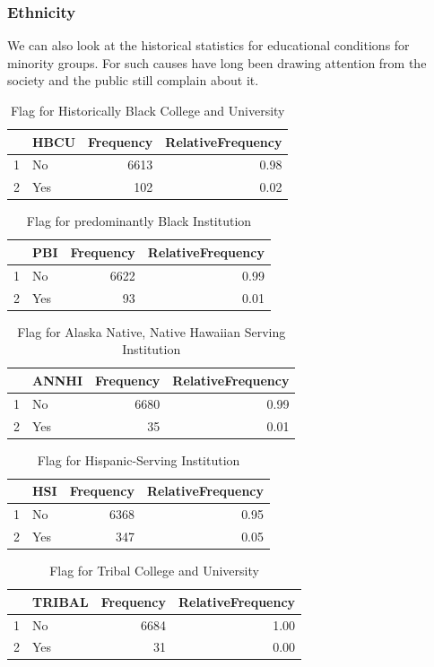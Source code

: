 \documentclass{article}\usepackage[]{graphicx}\usepackage[]{color}
\begin{document}
\subsubsection{Ethnicity}

We can also look at the historical statistics for educational conditions for minority groups. For such causes have long been drawing attention from the society and the public still complain about it.
\begin{table}[ht]
\centering
\begin{tabular}{rlrr}
  \hline
 & HBCU & Frequency & RelativeFrequency \\ 
  \hline
1 & No & 6613 & 0.98 \\ 
  2 & Yes & 102 & 0.02 \\ 
   \hline
\end{tabular}
\caption{Flag for Historically Black College and University} 
\end{table}
\begin{table}[ht]
\centering
\begin{tabular}{rlrr}
  \hline
 & PBI & Frequency & RelativeFrequency \\ 
  \hline
1 & No & 6622 & 0.99 \\ 
  2 & Yes &  93 & 0.01 \\ 
   \hline
\end{tabular}
\caption{Flag for predominantly Black Institution} 
\end{table}
\begin{table}[ht]
\centering
\begin{tabular}{rlrr}
  \hline
 & ANNHI & Frequency & RelativeFrequency \\ 
  \hline
1 & No & 6680 & 0.99 \\ 
  2 & Yes &  35 & 0.01 \\ 
   \hline
\end{tabular}
\caption{Flag for Alaska Native, Native Hawaiian Serving Institution} 
\end{table}
\begin{table}[ht]
\centering
\begin{tabular}{rlrr}
  \hline
 & HSI & Frequency & RelativeFrequency \\ 
  \hline
1 & No & 6368 & 0.95 \\ 
  2 & Yes & 347 & 0.05 \\ 
   \hline
\end{tabular}
\caption{Flag for Hispanic-Serving Institution} 
\end{table}
\begin{table}[ht]
\centering
\begin{tabular}{rlrr}
  \hline
 & TRIBAL & Frequency & RelativeFrequency \\ 
  \hline
1 & No & 6684 & 1.00 \\ 
  2 & Yes &  31 & 0.00 \\ 
   \hline
\end{tabular}
\caption{Flag for Tribal College and University} 
\end{table}
\end{document}
